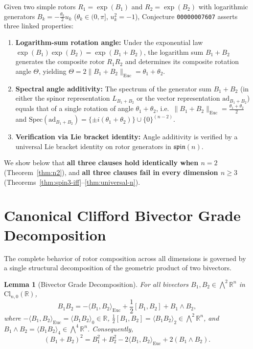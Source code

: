 \documentclass[11pt]{article}
\newtheorem{lemma}[theorem]{Lemma}
\theoremstyle{definition}
\newcommand{\Cl}{\mathrm{Cl}}
\newcommand{\spinlie}{\mathfrak{spin}}
\newcommand{\Spec}{\mathrm{Spec}}
\newcommand{\ad}{\mathrm{ad}}
\newcommand{\Euc}{\mathrm{Euc}}
\newcommand{\grade}[2]{\langle #1 \rangle_{#2}}
\begin{document}
Given two simple rotors $R_1 = \exp(B_1)$ and $R_2 = \exp(B_2)$ with logarithmic generators
$B_k = -\frac{\theta_k}{2} u_k$ ($\theta_k \in (0, \pi]$, $u_k^2 = -1$), Conjecture
\texttt{00000007607} asserts three linked properties:
\begin{enumerate}
  \item[\textbf{(I)}] \textbf{Logarithm-sum rotation angle:} Under the exponential law
    $\exp(B_1)\exp(B_2) = \exp(B_1 + B_2)$, the logarithm sum $B_1 + B_2$ generates the
    composite rotor $R_1 R_2$ and determines its composite rotation angle $\Theta$, yielding
    $\Theta = 2\|B_1 + B_2\|_{\Euc} = \theta_1 + \theta_2$.
  \item[\textbf{(II)}] \textbf{Spectral angle additivity:} The spectrum of the generator sum
    $B_1 + B_2$ (in either the spinor representation $L_{B_1 + B_2}$ or the vector
    representation $\ad_{B_1 + B_2}$) equals that of a single rotation of angle
    $\theta_1 + \theta_2$, i.e.\ $\|B_1 + B_2\|_{\Euc} = \frac{\theta_1 + \theta_2}{2}$ and
    $\Spec(\ad_{B_1 + B_2}) = \{\pm i(\theta_1 + \theta_2)\} \cup \{0\}^{(n-2)}$.
  \item[\textbf{(III)}] \textbf{Verification via Lie bracket identity:} Angle additivity is
    verified by a universal Lie bracket identity on rotor generators in $\spinlie(n)$.
\end{enumerate}

We show below that \textbf{all three clauses hold identically when $n = 2$} (Theorem~\ref{thm:n2}),
and \textbf{all three clauses fail in every dimension $n \ge 3$}
(Theorems~\ref{thm:spin3-iff}--\ref{thm:universal-n}).

\section{Canonical Clifford Bivector Grade Decomposition}

The complete behavior of rotor composition across all dimensions is governed by a single
structural decomposition of the geometric product of two bivectors.

\begin{lemma}[Bivector Grade Decomposition]\label{lem:grade-decomp}
For all bivectors $B_1, B_2 \in \bigwedge^2 \mathbb{R}^n$ in $\Cl_{n,0}(\mathbb{R})$,
\begin{equation}\label{eq:grade-decomp}
  B_1 B_2 = -\langle B_1, B_2 \rangle_{\Euc}
  + \frac{1}{2}[B_1, B_2] + B_1 \wedge B_2,
\end{equation}
where $-\langle B_1, B_2 \rangle_{\Euc} = \grade{B_1 B_2}{0} \in \mathbb{R}$,
$\frac{1}{2}[B_1, B_2] = \grade{B_1 B_2}{2} \in \bigwedge^2 \mathbb{R}^n$, and
$B_1 \wedge B_2 = \grade{B_1 B_2}{4} \in \bigwedge^4 \mathbb{R}^n$. Consequently,
\begin{equation}\label{eq:sum-sq-general}
  (B_1 + B_2)^2 = B_1^2 + B_2^2 - 2\langle B_1, B_2 \rangle_{\Euc} + 2(B_1 \wedge B_2).
\end{equation}
\end{lemma}
\end{document}
